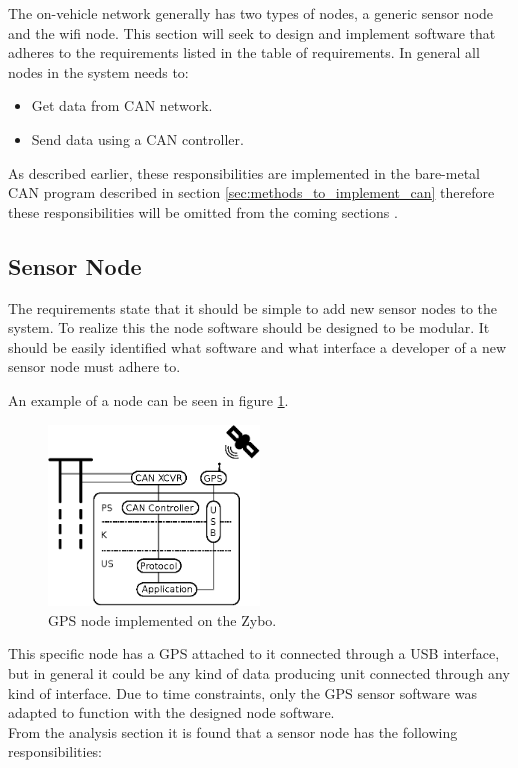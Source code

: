 The on-vehicle network generally has two types of nodes, a generic sensor node and the wifi node.
This section will seek to design and implement software that adheres to the requirements listed in the table of requirements.
In general all nodes in the system needs to:
\begin{itemize}
\item Get data from CAN network.
\item Send data using a CAN controller.
\end{itemize}
As described earlier, these responsibilities are implemented in the bare-metal CAN program described in section \ref{sec:methods_to_implement_can} therefore these responsibilities will be omitted from the coming sections .

\subsection{Sensor Node}
\label{sec:sensor_node}
The requirements state that it should be simple to add new sensor nodes to the system. 
To realize this the node software should be designed to be modular.
It should be easily identified what software and what interface a developer of a new sensor node must adhere to.

An example of a node can be seen in figure \ref{fig:gps_node}.


\begin{figure}[!h]
\centering
\includegraphics[width=0.5\textwidth]{graphics/analysis_gps.eps}
\caption{GPS node implemented on the Zybo.}
\label{fig:gps_node}
\end{figure}

This specific node has a GPS attached to it connected through a USB interface, but in general it could be any kind of data producing unit connected through any kind of interface.
Due to time constraints, only the GPS sensor software was adapted to function with the designed node software.\\
From the analysis section it is found that a sensor node has the following responsibilities:

